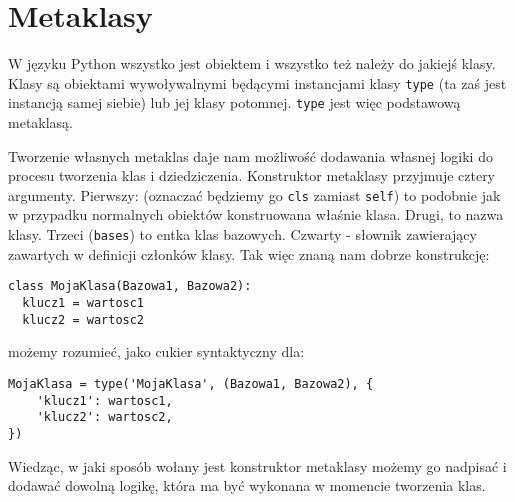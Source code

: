 \section{Metaklasy}

W języku Python wszystko jest obiektem i wszystko też należy do jakiejś klasy.
Klasy są obiektami wywoływalnymi będącymi instancjami klasy \verb|type| (ta
zaś jest instancją samej siebie) lub jej klasy potomnej. \verb|type| jest więc
podstawową metaklasą.
 
Tworzenie własnych metaklas daje nam możliwość dodawania własnej logiki do
procesu tworzenia klas i dziedziczenia. Konstruktor metaklasy przyjmuje cztery
argumenty. Pierwszy: (oznaczać będziemy go \verb|cls| zamiast \verb|self|) to
podobnie jak w przypadku normalnych obiektów konstruowana właśnie klasa. Drugi,
to nazwa klasy. Trzeci (\verb|bases|) to entka klas bazowych. Czwarty - słownik
zawierający zawartych w definicji członków klasy. Tak więc znaną nam dobrze
konstrukcję:
\begin{verbatim}
class MojaKlasa(Bazowa1, Bazowa2):
  klucz1 = wartosc1
  klucz2 = wartosc2
\end{verbatim}
możemy rozumieć, jako cukier syntaktyczny dla:
\begin{verbatim}
MojaKlasa = type('MojaKlasa', (Bazowa1, Bazowa2), {
    'klucz1': wartosc1,
    'klucz2': wartosc2,
})
\end{verbatim}

Wiedząc, w jaki sposób wołany jest konstruktor metaklasy możemy go nadpisać i
dodawać dowolną logikę, która ma być wykonana w momencie tworzenia klas.
